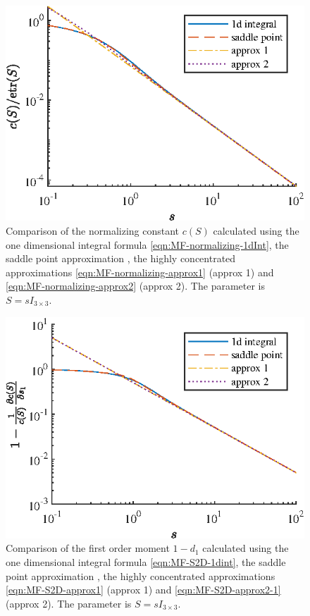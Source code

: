 \begin{figure}
	\centering
	\includegraphics[scale=1.4]{figures/MF-normal-approx1}
	\caption{Comparison of the normalizing constant $c(S)$ calculated using the one dimensional integral formula \eqref{eqn:MF-normalizing-1dInt}, the saddle point approximation \cite{kume2005saddlepoint}, the highly concentrated approximations \eqref{eqn:MF-normalizing-approx1} (approx 1) and \eqref{eqn:MF-normalizing-approx2} (approx 2).
	The parameter is $S = sI_{3\times 3}$.
	\label{fig:MF-nomral-approx1}}
\end{figure}

\begin{figure}
	\centering
	\includegraphics[scale=1.4]{figures/MF-S2D-approx1}
	\caption{Comparison of the first order moment $1-d_1$ calculated using the one dimensional integral formula \eqref{eqn:MF-S2D-1dint}, the saddle point approximation \cite{kume2005saddlepoint,kume2007derivatives}, the highly concentrated approximations \eqref{eqn:MF-S2D-approx1} (approx 1) and \eqref{eqn:MF-S2D-approx2-1} (approx 2).
	The parameter is $S = sI_{3\times 3}$.
	\label{fig:MF-S2D-approx1}}
\end{figure}

